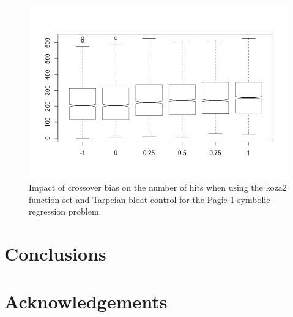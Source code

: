 \documentclass{sig-alternate}
\begin{document}
\begin{figure}
\centering
\includegraphics[width=0.45 \textwidth]{Plots/Pagie-1-tarp.png}
\caption{Impact of crossover bias on the number of hits when using the koza2 function set and Tarpeian bloat control for the Pagie-1 symbolic regression problem.}
\label{fig:Pagie1Koza2Tarpeian}
\end{figure}

\section{Conclusions} \label{Conclusions}

\section*{Acknowledgements}

\pagebreak



\end{document}
